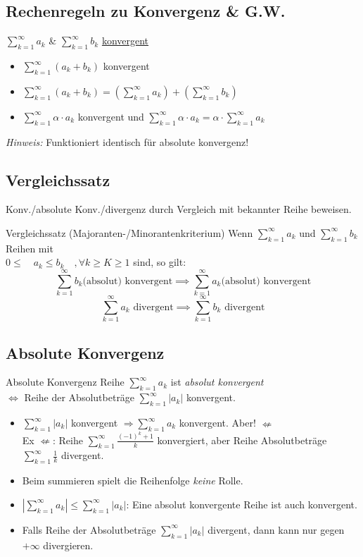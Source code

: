 \documentclass[a4paper]{article}
\def\sumk{\sum_{k=1}^\infty}
\begin{document}
\subsection{Rechenregeln zu Konvergenz \& G.W.}
$\sumk a_k$ \& $\sumk b_k$ \underline{konvergent}
\begin{itemize}[leftmargin=10mm, topsep=1pt, parsep=1pt]
  \item[$\implies$] $\sumk (a_k + b_k)$ konvergent 
  \item[$\implies$] $\sumk (a_k + b_k) = \left( \sumk a_k \right) + \left( \sumk b_k \right)$
  \item[$\implies$] $\sumk \alpha \cdot a_k$ konvergent und $\sumk \alpha \cdot a_k = \alpha \cdot \sumk a_k$
\end{itemize}
\textit{Hinweis:} Funktioniert identisch für absolute konvergenz! \\


\subsection{Vergleichssatz}
Konv./absolute Konv./divergenz durch Vergleich mit bekannter Reihe beweisen.
\begin{mainbox}{Vergleichssatz \tiny (Majoranten-/Minorantenkriterium) \normalsize}
  Wenn $\sumk a_k$ und $\sumk b_k$ Reihen mit \\ 
    $0 \le \quad a_k \le b_k \quad, \forall k \ge K \ge 1$ sind, so gilt:
  $$\sumk b_k \text{(absolut) konvergent} \implies \sumk a_k \text{(absolut) konvergent}$$
  $$\sumk a_k \text{ divergent} \implies \sumk b_k \text{ divergent}$$
\end{mainbox}

\subsection{Absolute Konvergenz}
\begin{mainbox}{Absolute Konvergenz}
  Reihe $\sumk a_k$ ist \textit{absolut konvergent} \\
  $\iff$ Reihe der Absolutbeträge $\sumk |a_k|$ konvergent. \\
\end{mainbox}
\begin{itemize}[leftmargin=4.5mm, topsep=1pt, parsep=1pt]
  \item  $\sumk |a_k|$ konvergent $\Rightarrow \sumk a_k$ konvergent. Aber! $\nLeftarrow$ \\
        \tiny \color{gray}
          Ex $\nLeftarrow$: Reihe $\sum_{k=1}^{\infty} \frac{(-1)^k+1}{k}$ konvergiert, aber Reihe Absolutbeträge $\sum_{k=1}^{\infty} \frac{1}{k}$ divergent. \\
        \normalsize \color{black}
  \item Beim summieren spielt die Reihenfolge \textit{keine} Rolle. \\
  \item $|\sumk a_k| \le \sumk |a_k|$: Eine absolut konvergente Reihe ist auch konvergent. \\
  \item Falls Reihe der Absolutbeträge $\sum_{k=1}^{\infty} |a_k|$ divergent, dann kann nur gegen $+\infty$ divergieren.
\end{itemize}
\end{document}
